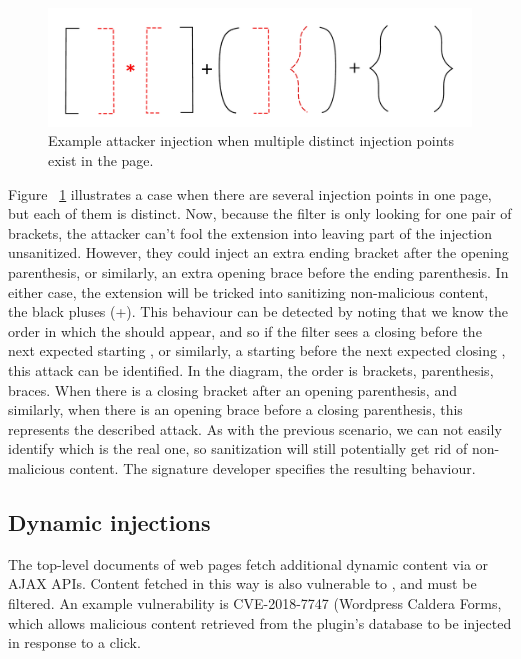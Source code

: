 \begin{figure}[h]
	\includegraphics[scale=0.25]{img/attacker_injection_unique.pdf}
	\caption{Example attacker injection when multiple distinct injection points exist in the page.}
	\label{fig:attacker_injection_unique}
\end{figure}


Figure ~\ref{fig:attacker_injection_unique} illustrates a case when there are several injection points in one page, but each of them is distinct. Now, because the filter is only looking for one pair of brackets, the attacker can't fool the extension into leaving part of the injection unsanitized. However, they could inject an extra ending bracket after the opening parenthesis, or similarly, an extra opening brace before the ending parenthesis. In either case, the extension will be tricked into sanitizing non-malicious content, the black pluses (+). This behaviour can be detected by noting that we know the order in which the  should appear, and so if the filter sees a closing  before the next expected starting , or similarly, a starting  before the next expected closing , this attack can be identified. In the diagram, the order is brackets, parenthesis, braces. When there is a closing bracket after an opening parenthesis, and similarly, when there is an opening brace before a closing parenthesis, this represents the described attack. As with the previous scenario, we can not easily identify which  is the real one, so sanitization will still potentially get rid of non-malicious content. The signature developer specifies the resulting behaviour.

\subsection{Dynamic injections} \label{dynamic_injections}

The top-level documents of web pages fetch additional dynamic content
via  or AJAX APIs. Content fetched in
this way is also vulnerable to \xss, and must be filtered. An example
vulnerability is CVE-2018-7747 (Wordpress Caldera Forms, which allows malicious
content retrieved from the plugin's database to be injected in response to a click.

